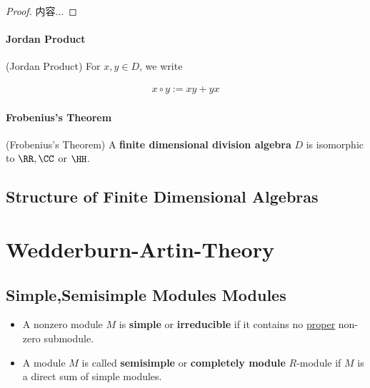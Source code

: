 \documentclass[Total.tex]{subfiles}
\begin{document}
	\begin{proof}
		内容...
	\end{proof}
	
	\subsubsection{Jordan Product}
	
	\begin{Def}
		\label{Division-Algebra-Jordan-Product}(Jordan Product) For $x,y\in D$, we write
		
		\begin{gather*}
			x\circ y:=xy+yx
		\end{gather*}
	\end{Def}
	
	\subsubsection{Frobenius's Theorem}
	
	\begin{theorem}
		\label{Division-Algebra-Frobenius-Theorem} (Frobenius's Theorem) A \textbf{finite dimensional division algebra} $D$ is isomorphic to $\RR,\CC$ or $\HH$.
	\end{theorem}
	
	\section{Structure of Finite Dimensional Algebras}
	
	\chapter{Wedderburn-Artin-Theory}
	\section{Simple,Semisimple Modules Modules}
	
	\begin{Def}
		
		\begin{itemize}
			\item 
			\label{simple-module}\label{irreducible-module}  A nonzero module $M$ is \textbf{simple} or \textbf{irreducible} if it contains no \underline{proper} non-zero submodule.
			
			\item \label{semisimple-module}\label{completely- module} A module $M$ is called \textbf{semisimple} or \textbf{completely module} $R$-module if $M$ is a direct sum of simple modules. 
		\end{itemize} 
	\end{Def}
	
\end{document}
